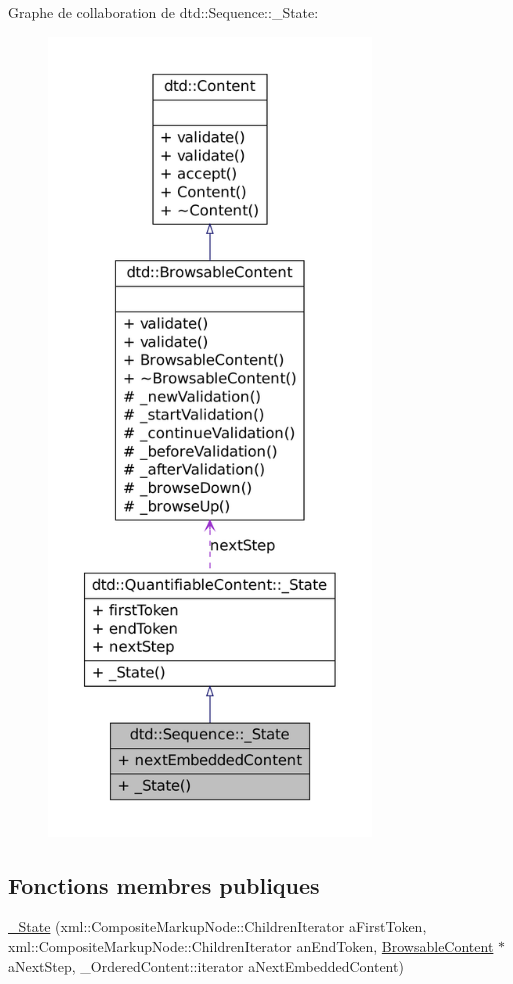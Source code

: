Graphe de collaboration de dtd::Sequence::\_\-State:\nopagebreak
\begin{figure}[H]
\begin{center}
\leavevmode
\includegraphics[height=600pt]{structdtd_1_1_sequence_1_1___state__coll__graph}
\end{center}
\end{figure}
\subsection*{Fonctions membres publiques}
\begin{DoxyCompactItemize}
\item 
\hyperlink{structdtd_1_1_sequence_1_1___state_af1e1d0084dedb7c9b1bf8ea0e2e3b787}{\_\-State} (xml::CompositeMarkupNode::ChildrenIterator aFirstToken, xml::CompositeMarkupNode::ChildrenIterator anEndToken, \hyperlink{classdtd_1_1_browsable_content}{BrowsableContent} $\ast$aNextStep, \_\-OrderedContent::iterator aNextEmbeddedContent)
\end{DoxyCompactItemize}
